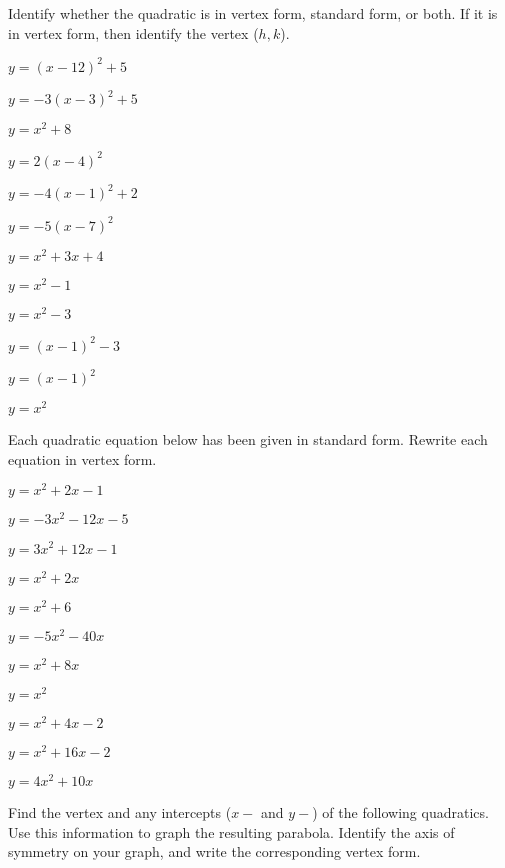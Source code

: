 \documentclass[12pt]{article}
\theoremstyle{definition}
\begin{document}
Identify whether the quadratic is in vertex form, standard form, or both.  If it is in vertex form, then identify the vertex ($h,k$).

\begin{enumerate}
\begin{multicols}{3}
\setcounter{enumi}{7}
  \item $y=(x-12)^2+5$
  \item $y=-3(x-3)^2+5$
  \item $y=x^2+8$
  \item $y=2(x-4)^2 $
  \item $y=-4(x-1)^2+2$
  \item $y=-5(x-7)^2$
  \item $y=x^2+3x+4$
  \item $y=x^2-1$
  \item $y=x^2-3$
  \item $y=(x-1)^2-3 $
  \item $y=(x-1)^2$
  \item $y=x^2$
\end{multicols}
\end{enumerate}

Each quadratic equation below has been given in standard form.  Rewrite each equation in vertex form.

\begin{enumerate}
\begin{multicols}{3}
\setcounter{enumi}{19}
  \item $y=x^2+2x-1 $
  \item $y=-3x^2-12x-5 $
  \item $y=3x^2+12x-1$
  \item $y=x^2+2x$
  \item $y=x^2+6$
  \item $y=-5x^2-40x$
  \item $y=x^2+8x$
  \item $y=x^2$
  \item $y=x^2+4x-2$
  \item $y=x^2+16x-2$
  \item $y=4x^2+10x$
\end{multicols}
\end{enumerate}

Find the vertex and any intercepts ($x-$ and $y-$) of the following quadratics. Use
this information to graph the resulting parabola.  Identify the axis of symmetry on your graph, and write the corresponding vertex form.
\end{document}
